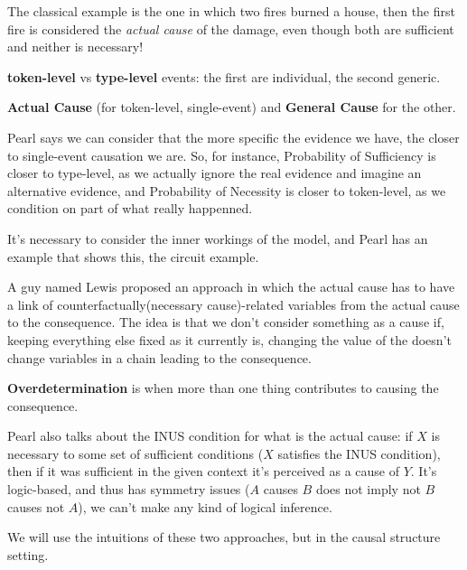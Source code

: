 The classical example is the one in which two fires burned a house, then the first fire is considered the \textit{actual cause} of the damage, even though both are sufficient and neither is necessary!

\textbf{token-level} vs \textbf{type-level} events: the first are individual, the second generic.

\textbf{Actual Cause} (for token-level, single-event) and \textbf{General Cause} for the other.

Pearl says we can consider that the more specific the evidence we have, the closer to single-event causation we are. So, for instance, Probability of Sufficiency is closer to type-level, as we actually ignore the real evidence and imagine an alternative evidence, and Probability of Necessity is closer to token-level, as we condition on part of what really happenned.

It's necessary to consider the inner workings of the model, and Pearl has an example that shows this, the circuit example.

A guy named Lewis proposed an approach in which the actual cause has to have a link of counterfactually(necessary cause)-related variables from the actual cause to the consequence. The idea is that we don't consider something as a cause if, keeping everything else fixed as it currently is, changing the value of the  doesn't change variables in a chain leading to the consequence.

\textbf{Overdetermination} is when more than one thing contributes to causing the consequence.

Pearl also talks about the INUS condition for what is the actual cause: if $X$ is necessary to some set of sufficient conditions ($X$ satisfies the INUS condition), then if it was sufficient in the given context it's perceived as a cause of $Y$. It's logic-based, and thus has symmetry issues ($A$ causes $B$ does not imply not $B$ causes not $A$), we can't make any kind of logical inference.

We will use the intuitions of these two approaches, but in the causal structure setting.
